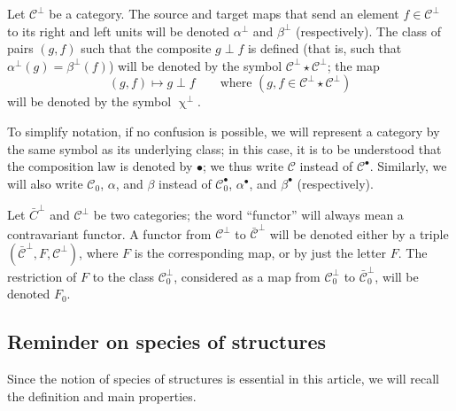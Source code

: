 \documentclass[fleqn]{article}
\newcommand{\oldpage}[1]{\marginpar{\footnotesize$\Big\vert$ \textit{p.~#1}}}
\newcommand{\CC}{\mathcal{C}}
\newcommand{\comp}{\upchi}
\begin{document}
Let $\CC^\perp$ be a category.
The source and target maps that send an element $f\in\CC^\perp$ to its right and left units will be denoted $\alpha^\perp$ and $\beta^\perp$ (respectively).
The class of pairs $(g,f)$ such that the composite $g\perp f$ is defined (that is, such that $\alpha^\perp(g)=\beta^\perp(f)$) will be denoted by the symbol $\CC^\perp\star\CC^\perp$;
the map
\[
  (g,f) \longmapsto g\perp f
  \qquad\text{where $(g,f\in\CC^\perp\star\CC^\perp)$}
\]
will be denoted by the symbol $\comp^\perp$.

\oldpage{351}
To simplify notation, if no confusion is possible, we will represent a category by the same symbol as its underlying class;
in this case, it is to be understood that the composition law is denoted by $\bullet$;
we thus write $\CC$ instead of $\CC^\bullet$.
Similarly, we will also write $\CC_0$, $\alpha$, and $\beta$ instead of $\CC_0^\bullet$, $\alpha^\bullet$, and $\beta^\bullet$ (respectively).

Let $\bar{C}^\perp$ and $\CC^\perp$ be two categories;
the word ``functor'' will always mean a contravariant functor.
A functor from $\CC^\perp$ to $\bar{\CC}^\perp$ will be denoted either by a triple $(\bar{\CC}^\perp,F,\CC^\perp)$, where $F$ is the corresponding map, or by just the letter $F$.
The restriction of $F$ to the class $\CC_0^\perp$, considered as a map from $\CC_0^\perp$ to $\bar{\CC}_0^\perp$, will be denoted $F_0$.



\subsection{Reminder on species of structures}
\label{section:i.2}

Since the notion of species of structures \cite{3a} is essential in this article, we will recall the definition and main properties.
\end{document}

